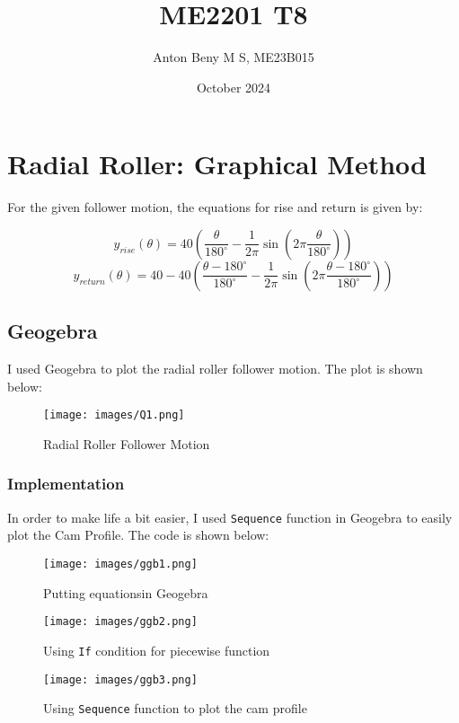 \documentclass[12pt]{article}
\title{ME2201 T8}
\author{Anton Beny M S, ME23B015}
\date{October 2024}
\begin{document}
\maketitle

\section{Radial Roller: Graphical Method}

For the given follower motion, the equations for rise and return is given by:

$$y_{rise} (\theta) = 40 \left (\frac{\theta}{180^{\circ}} - \frac{1}{2\pi}\sin\left (2\pi \frac{\theta}{180^{\circ}}\right )\right )$$
$$y_{return} (\theta) = 40 - 40\left (\frac{\theta - 180^{\circ}}{180^{\circ}} - \frac{1}{2\pi}\sin\left (2\pi \frac{\theta - 180^{\circ}}{180^{\circ}}\right )\right )$$

\subsection{Geogebra}

I used Geogebra to plot the radial roller follower motion. The plot is shown below:

\begin{figure}[H]
    \centering
    \texttt{[image: images/Q1.png]}
    \caption{Radial Roller Follower Motion}
\end{figure}

\subsubsection{Implementation}

In order to make life a bit easier, I used \texttt{Sequence} function in Geogebra to easily plot the Cam Profile. The code is shown below:

\begin{figure}[H]
    \centering
    \texttt{[image: images/ggb1.png]}
    \caption{Putting equationsin Geogebra}
\end{figure}

\begin{figure}[H]
    \centering
    \texttt{[image: images/ggb2.png]}
    \caption{Using \texttt{If} condition for piecewise function}
\end{figure}

\begin{figure}[H]
    \centering
    \texttt{[image: images/ggb3.png]}
    \caption{Using \texttt{Sequence} function to plot the cam profile}
\end{figure}
\end{document}
